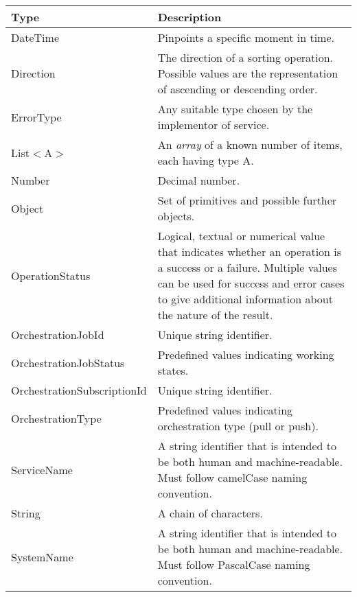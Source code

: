 \documentclass[a4paper]{arrowhead}
\newcommand{\pdef}[1]{{\textcolor{ArrowheadGrey}{#1\label{sec:model:primitives:#1}\label{sec:model:primitives:#1s}\label{sec:model:primitives:#1es}}}}
\begin{document}
\begin{table}[ht!]
\begin{tabularx}{\textwidth}{| p{4.3cm} | X |} \hline
\rowcolor{gray!33} Type & Description \\ \hline
\pdef{DateTime}         & Pinpoints a specific moment in time. \\ \hline
\pdef{Direction}        & The direction of a sorting operation. Possible values are the representation of ascending or descending order. \\ \hline
\pdef{ErrorType}        & Any suitable type chosen by the implementor of service. \\ \hline
\pdef{List}$<$A$>$      & An \textit{array} of a known number of items, each having type A. \\ \hline
\pdef{Number}           & Decimal number. \\ \hline
\pdef{Object}           & Set of primitives and possible further objects. \\ \hline
\pdef{OperationStatus}  & Logical, textual or numerical value that indicates whether an operation is a success or a failure. Multiple values can be used for success and error cases to give additional information about the nature of the result. \\ \hline
\pdef{OrchestrationJobId} & Unique string identifier. \\ \hline
\pdef{OrchestrationJobStatus} & Predefined values indicating working states. \\ \hline
\pdef{OrchestrationSubscriptionId} & Unique string identifier.\\ \hline
\pdef{OrchestrationType} & Predefined values indicating orchestration type (pull or push). \\ \hline
\pdef{ServiceName} & A string identifier that is intended to be both human and machine-readable. Must follow camelCase naming convention. \\ \hline
\pdef{String}           & A chain of characters. \\ \hline
\pdef{SystemName}             & A string identifier that is intended to be both human and machine-readable. Must follow PascalCase naming convention. \\ \hline
\end{tabularx}
\end{table}

\newpage




\newpage
\end{document}
